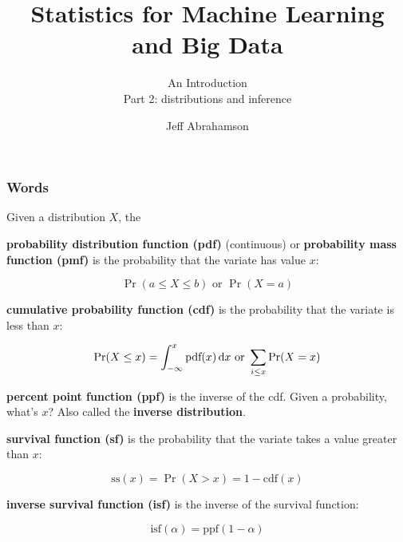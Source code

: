 

\title
{Statistics for Machine Learning and Big Data}
\subtitle{An Introduction\\[6mm] Part 2: distributions and inference}

\author[Abrahamson] {Jeff Abrahamson}




\begin{frame}
  \titlepage
\end{frame}


\begin{frame}
  \frametitle{Words}

  Given a distribution $X$, the

   {
    \textbf{probability distribution function (pdf)} (continuous) or
    \textbf{probability mass function (pmf)} is the probability that
    the variate has value $x$:
    
    \begin{displaymath}
      \Pr(a\le X \le b) \text{ or } \Pr(X=a)
    \end{displaymath}

  }
  
   {
    \textbf{cumulative probability function (cdf)} is the probability
    that the variate is less than $x$:

    \begin{displaymath}
      \Pr(X\le x) = \int_{-\infty}^x \text{pdf}(x) \,\mathrm{d}{x} \text{ or } \sum_{i\le x} \Pr(X = x)
    \end{displaymath}
  }
  
   {
    \textbf{percent point function (ppf)} is the inverse of the cdf.
    Given a probability, what's $x$?
    Also called the \textbf{inverse distribution}.
  }
  
   {
    \textbf{survival function (sf)} is the probability that the
    variate takes a value greater than $x$:

    \begin{displaymath}
      \text{ss}(x) = \Pr(X > x) = 1-\text{cdf}(x)
    \end{displaymath}
  }
  
   {
    \textbf{inverse survival function (isf)} is the inverse of the
    survival function:

    \begin{displaymath}
      \text{isf}(\alpha) = \text{ppf}(1-\alpha)
    \end{displaymath}
  }

\end{frame}

